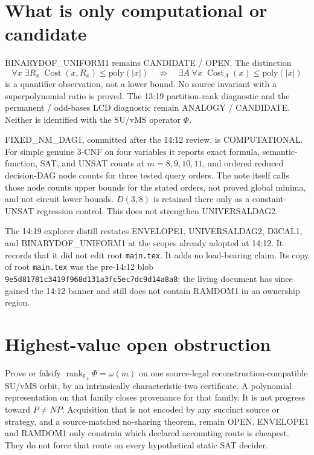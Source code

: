 \documentclass[11pt]{article}
\begin{document}
\section*{What is only computational or candidate}
BINARYDOF\_UNIFORM1 remains CANDIDATE / OPEN. The distinction
\[
\forall x\;\exists R_x\;\operatorname{Cost}(x,R_x)\le\mathrm{poly}(|x|)
\quad\not\Rightarrow\quad
\exists A\;\forall x\;\operatorname{Cost}_A(x)\le\mathrm{poly}(|x|)
\]
is a quantifier observation, not a lower bound. No source invariant with a superpolynomial
ratio is proved. The 13:19 partition-rank diagnostic and the permanent / odd-bases LCD
diagnostic remain ANALOGY / CANDIDATE. Neither is identified with the SU/vMS operator
\(\Phi\).

FIXED\_NM\_DAG1, committed after the 14:12 review, is COMPUTATIONAL. For simple genuine
3-CNF on four variables it reports exact formula, semantic-function, SAT, and UNSAT counts
at \(m=8,9,10,11\), and ordered reduced decision-DAG node counts for three tested query
orders. The note itself calls those node counts upper bounds for the stated orders, not
proved global minima, and not circuit lower bounds. \(D(3,8)\) is retained there only as
a constant-UNSAT regression control. This does not strengthen UNIVERSALDAG2.

The 14:19 explorer distill restates ENVELOPE1, UNIVERSALDAG2, D3CAL1, and
BINARYDOF\_UNIFORM1 at the scopes already adopted at 14:12. It records that it did not
edit root \texttt{main.tex}. It adds no load-bearing claim. Its copy of root
\texttt{main.tex} was the pre-14:12 blob
\texttt{9e5d81781c3419f968d131a3fc5ec7dc9d14a8a8}; the living document has since gained
the 14:12 banner and still does not contain RAMDOM1 in an ownership region.

\section*{Highest-value open obstruction}
Prove or falsify \(\operatorname{rank}_{\mathbb F_2}\Phi=\omega(m)\) on one source-legal
reconstruction-compatible SU/vMS orbit, by an intrinsically characteristic-two certificate.
A polynomial representation on that family closes provenance for that family. It is not
progress toward \(P\neq NP\). Acquisition that is not encoded by any succinct source or
strategy, and a source-matched no-sharing theorem, remain OPEN. ENVELOPE1 and RAMDOM1
only constrain which declared accounting route is cheapest. They do not force that route
on every hypothetical static SAT decider.
\end{document}

